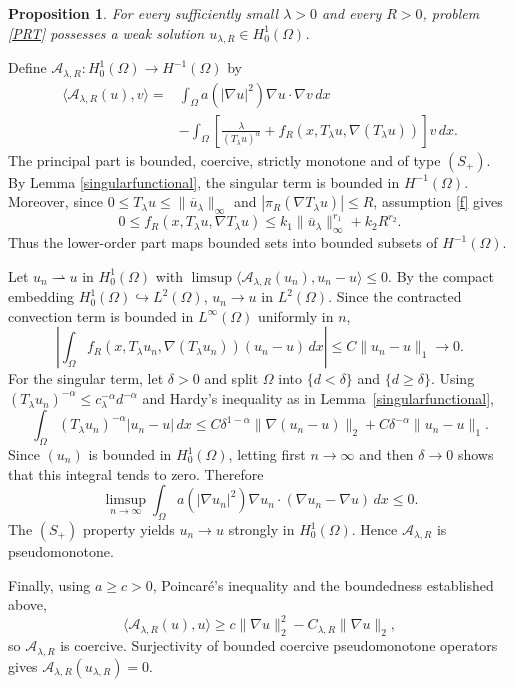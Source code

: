\documentclass[11pt,leqno]{amsart}
\makeatletter
\newtheorem{proposition}[theorem]{Proposition}
\renewenvironment{proof}[1][\proofname]{%
  \par
  \pushQED{\qed}%
  \normalfont
  \topsep6\p@\@plus6\p@\relax
  \trivlist
  \item[\hskip\labelsep\itshape #1\@addpunct{.}]%
  \hspace{0.5em}\ignorespaces
}{%
  \popQED
  \endtrivlist\@endpefalse
}
\makeatother
\begin{document}
\begin{proposition}\label{existtruncated}
For every sufficiently small $\lambda>0$ and every $R>0$, problem
\eqref{PRT} possesses a weak solution $u_{\lambda,R}\in H_0^1(\Omega)$.
\end{proposition}

\begin{proof}
Define $\mathcal A_{\lambda,R}:H_0^1(\Omega)\to H^{-1}(\Omega)$ by
\[
\begin{aligned}
\langle\mathcal A_{\lambda,R}(u),v\rangle
={}&\int_\Omega a(|\nabla u|^2)\nabla u\cdot\nabla v\,dx\\
&-\int_\Omega\left[
\frac{\lambda}{(T_\lambda u)^\alpha}
+f_R(x,T_\lambda u,\nabla(T_\lambda u))
\right]v\,dx.
\end{aligned}
\]
The principal part is bounded, coercive, strictly monotone and of type
$(S_+)$.  By Lemma \ref{singularfunctional}, the singular term is bounded
in $H^{-1}(\Omega)$.  Moreover, since
$0\le T_\lambda u\le\|\overline u_\lambda\|_\infty$ and
$|\pi_R(\nabla T_\lambda u)|\le R$, assumption \eqref{f} gives
\[
0\le f_R(x,T_\lambda u,\nabla T_\lambda u)
\le k_1\|\overline u_\lambda\|_\infty^{r_1}+k_2R^{r_2}.
\]
Thus the lower-order part maps bounded sets into bounded subsets of
$H^{-1}(\Omega)$.

Let $u_n\rightharpoonup u$ in $H_0^1(\Omega)$ with
$\limsup\langle\mathcal A_{\lambda,R}(u_n),u_n-u\rangle\le0$. By the
compact embedding $H_0^1(\Omega)\hookrightarrow L^2(\Omega)$, $u_n\to u$ in
$L^2(\Omega)$. Since the contracted convection term is bounded in
$L^\infty(\Omega)$ uniformly in $n$,
\[
\left|\int_\Omega f_R(x,T_\lambda u_n,\nabla(T_\lambda u_n))(u_n-u)\,dx\right|
\le C\|u_n-u\|_1\to0 .
\]
For the singular term, let $\delta>0$ and split $\Omega$ into
$\{d<\delta\}$ and $\{d\ge\delta\}$. Using
$(T_\lambda u_n)^{-\alpha}\le c_\lambda^{-\alpha}d^{-\alpha}$ and Hardy's
inequality as in Lemma~\ref{singularfunctional},
\[
\int_\Omega (T_\lambda u_n)^{-\alpha}|u_n-u|\,dx
\le C\delta^{1-\alpha}\|\nabla(u_n-u)\|_2+C\delta^{-\alpha}\|u_n-u\|_1 .
\]
Since $(u_n)$ is bounded in $H_0^1(\Omega)$, letting first $n\to\infty$
and then $\delta\to0$ shows that this integral tends to zero. Therefore
\[
\limsup_{n\to\infty}
\int_\Omega a(|\nabla u_n|^2)\nabla u_n\cdot
(\nabla u_n-\nabla u)\,dx\le0.
\]
The $(S_+)$ property yields $u_n\to u$ strongly in $H_0^1(\Omega)$.
Hence $\mathcal A_{\lambda,R}$ is pseudomonotone.

Finally, using $a\ge c>0$, Poincar\'e's inequality and the boundedness
established above,
\[
\langle\mathcal A_{\lambda,R}(u),u\rangle
\ge c\|\nabla u\|_2^2-C_{\lambda,R}\|\nabla u\|_2,
\]
so $\mathcal A_{\lambda,R}$ is coercive.  Surjectivity of bounded
coercive pseudomonotone operators gives
$\mathcal A_{\lambda,R}(u_{\lambda,R})=0$.
\end{proof}
\end{document}
